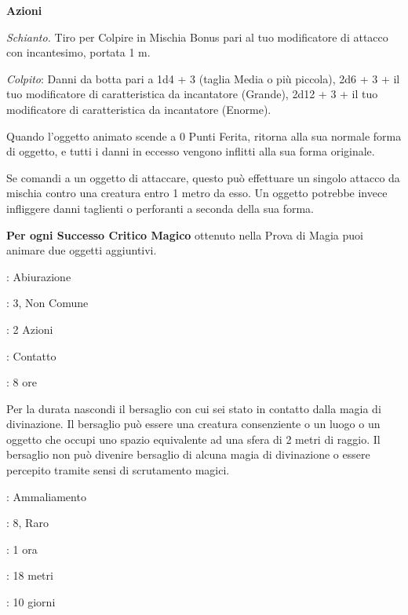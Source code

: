 \begin{multicols}{2}
\textbf{Azioni}

\textit{Schianto.} Tiro per Colpire in Mischia Bonus pari al tuo modificatore di attacco con incantesimo, portata 1 m.

\emph{Colpito}: Danni da botta pari a 1d4 + 3 (taglia Media o più piccola), 2d6 + 3 + il tuo modificatore di caratteristica da incantatore (Grande),  2d12 + 3 + il tuo modificatore di caratteristica da incantatore (Enorme).

Quando l'oggetto animato scende a 0 Punti Ferita, ritorna alla sua normale forma di oggetto, e tutti i danni in eccesso vengono inflitti alla sua forma originale.

Se comandi a un oggetto di attaccare, questo può effettuare un singolo attacco da mischia contro una creatura entro 1 metro da esso. Un oggetto potrebbe invece infliggere danni taglienti o perforanti a seconda della sua forma.

\textbf{Per ogni Successo Critico Magico} ottenuto nella Prova di Magia puoi animare due oggetti aggiuntivi.

\noindent\colorbox{OBSSgold!10}{
\begin{minipage}{0.95\linewidth}
\begin{description}[noitemsep, topsep=0pt, parsep=0pt, partopsep=0pt, leftmargin=0cm, labelwidth=1.3cm]
	\item[\textbf{Lista}]: Abiurazione
	\item[\textbf{Livello}]: 3, Non Comune
	\item[\textbf{Lancio}]: 2 Azioni
	\item[\textbf{Gittata}]: Contatto
	\item[\textbf{Durata}]: 8 ore
\end{description}
\end{minipage}}\smallskip

Per la durata nascondi il bersaglio con cui sei stato in contatto dalla magia di divinazione. Il bersaglio può essere una creatura consenziente o un luogo o un oggetto che occupi uno spazio equivalente ad una sfera di 2 metri di raggio. Il bersaglio non può divenire bersaglio di alcuna magia di divinazione o essere percepito tramite sensi di scrutamento magici.

\noindent\colorbox{OBSSgold!10}{
\begin{minipage}{0.95\linewidth}
\begin{description}[noitemsep, topsep=0pt, parsep=0pt, partopsep=0pt, leftmargin=0cm, labelwidth=1.3cm]
	\item[\textbf{Lista}]: Ammaliamento
	\item[\textbf{Livello}]: 8, Raro
	\item[\textbf{Lancio}]: 1 ora
	\item[\textbf{Gittata}]: 18 metri
	\item[\textbf{Durata}]: 10 giorni
\end{description}
\end{minipage}}\smallskip


\end{multicols}
